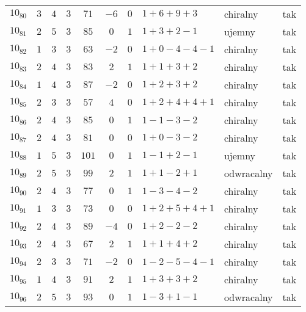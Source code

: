 \begin{longtable}{lccccccllc}
$10_{80}$   &  $3$     &  $4$  &  $3$      &  $71$   &  $-6$  &  $0$  &  $1+6+9+3$      &  chiralny    &  tak  \\
$10_{81}$   &  $2$     &  $5$  &  $3$      &  $85$   &  $0$   &  $1$  &  $1+3+2-1$      &  ujemny      &  tak  \\
$10_{82}$   &  $1$     &  $3$  &  $3$      &  $63$   &  $-2$  &  $0$  &  $1+0-4-4-1$    &  chiralny    &  tak  \\
$10_{83}$   &  $2$     &  $4$  &  $3$      &  $83$   &  $2$   &  $1$  &  $1+1+3+2$      &  chiralny    &  tak  \\
$10_{84}$   &  $1$     &  $4$  &  $3$      &  $87$   &  $-2$  &  $0$  &  $1+2+3+2$      &  chiralny    &  tak  \\
$10_{85}$   &  $2$     &  $3$  &  $3$      &  $57$   &  $4$   &  $0$  &  $1+2+4+4+1$    &  chiralny    &  tak  \\
$10_{86}$   &  $2$     &  $4$  &  $3$      &  $85$   &  $0$   &  $1$  &  $1-1-3-2$      &  chiralny    &  tak  \\
$10_{87}$   &  $2$     &  $4$  &  $3$      &  $81$   &  $0$   &  $0$  &  $1+0-3-2$      &  chiralny    &  tak  \\
$10_{88}$   &  $1$     &  $5$  &  $3$      &  $101$  &  $0$   &  $1$  &  $1-1+2-1$      &  ujemny      &  tak  \\
$10_{89}$   &  $2$     &  $5$  &  $3$      &  $99$   &  $2$   &  $1$  &  $1+1-2+1$      &  odwracalny  &  tak  \\
$10_{90}$   &  $2$     &  $4$  &  $3$      &  $77$   &  $0$   &  $1$  &  $1-3-4-2$      &  chiralny    &  tak  \\
$10_{91}$   &  $1$     &  $3$  &  $3$      &  $73$   &  $0$   &  $0$  &  $1+2+5+4+1$    &  chiralny    &  tak  \\
$10_{92}$   &  $2$     &  $4$  &  $3$      &  $89$   &  $-4$  &  $0$  &  $1+2-2-2$      &  chiralny    &  tak  \\
$10_{93}$   &  $2$     &  $4$  &  $3$      &  $67$   &  $2$   &  $1$  &  $1+1+4+2$      &  chiralny    &  tak  \\
$10_{94}$   &  $2$     &  $3$  &  $3$      &  $71$   &  $-2$  &  $0$  &  $1-2-5-4-1$    &  chiralny    &  tak  \\
$10_{95}$   &  $1$     &  $4$  &  $3$      &  $91$   &  $2$   &  $1$  &  $1+3+3+2$      &  chiralny    &  tak  \\
$10_{96}$   &  $2$     &  $5$  &  $3$      &  $93$   &  $0$   &  $1$  &  $1-3+1-1$      &  odwracalny  &  tak  \\

\end{longtable}
